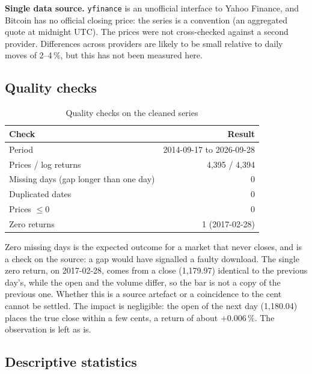 \documentclass[12pt,a4paper]{article}
\begin{document}
\begin{limitbox}
	\textbf{Single data source.} \texttt{yfinance} is an unofficial interface to Yahoo Finance, and Bitcoin has no official closing price: the series is a convention (an aggregated quote at midnight UTC). The prices were not cross-checked against a second provider. Differences across providers are likely to be small relative to daily moves of 2--4\,\%, but this has not been measured here.
\end{limitbox}

\subsection{Quality checks}

\begin{table}[H]
	\centering
	\caption{Quality checks on the cleaned series}
	\label{tab:data-quality}
	\begin{tabular}{lr}
		\toprule
		Check & Result \\
		\midrule
		Period & 2014-09-17 to 2026-09-28 \\
		Prices / log returns & 4,395 / 4,394 \\
		Missing days (gap longer than one day) & 0 \\
		Duplicated dates & 0 \\
		Prices $\le 0$ & 0 \\
		Zero returns & 1 (2017-02-28) \\
		\bottomrule
	\end{tabular}
\end{table}

Zero missing days is the expected outcome for a market that never closes, and is a check on the source: a gap would have signalled a faulty download. The single zero return, on 2017-02-28, comes from a close (1,179.97) identical to the previous day's, while the open and the volume differ, so the bar is not a copy of the previous one. Whether this is a source artefact or a coincidence to the cent cannot be settled. The impact is negligible: the open of the next day (1,180.04) places the true close within a few cents, a return of about $+0.006\,\%$. The observation is left as is.

\subsection{Descriptive statistics}
\end{document}
